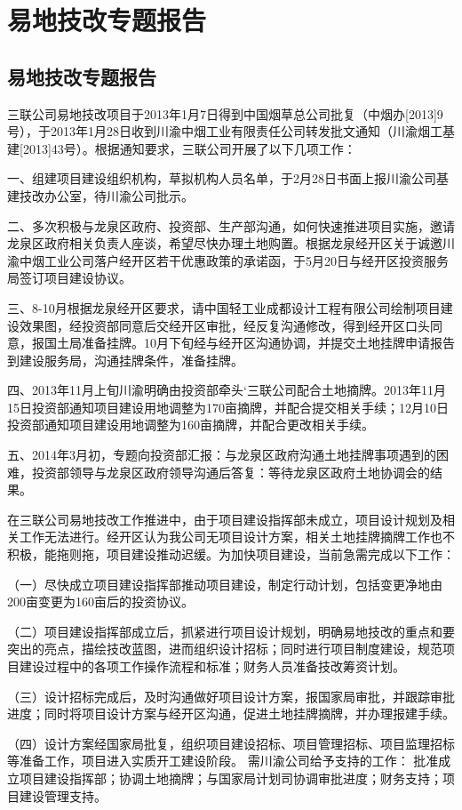 ﻿\chapter{易地技改专题报告}
\section{易地技改专题报告}
三联公司易地技改项目于2013年1月7日得到中国烟草总公司批复（中烟办[2013]9号），于2013年1月28日收到川渝中烟工业有限责任公司转发批文通知（川渝烟工基建[2013]43号）。根据通知要求，三联公司开展了以下几项工作：

一、组建项目建设组织机构，草拟机构人员名单，于2月28日书面上报川渝公司基建技改办公室，待川渝公司批示。

二、多次积极与龙泉区政府、投资部、生产部沟通，如何快速推进项目实施，邀请龙泉区政府相关负责人座谈，希望尽快办理土地购置。根据龙泉经开区关于诚邀川渝中烟工业公司落户经开区若干优惠政策的承诺函，于5月20日与经开区投资服务局签订项目建设协议。

三、8-10月根据龙泉经开区要求，请中国轻工业成都设计工程有限公司绘制项目建设效果图，经投资部同意后交经开区审批，经反复沟通修改，得到经开区口头同意，报国土局准备挂牌。10月下旬经与经开区沟通协调，并提交土地挂牌申请报告到建设服务局，沟通挂牌条件，准备挂牌。

四、2013年11月上旬川渝明确由投资部牵头‘三联公司配合土地摘牌。2013年11月15日投资部通知项目建设用地调整为170亩摘牌，并配合提交相关手续；12月10日投资部通知项目建设用地调整为160亩摘牌，并配合更改相关手续。

五、2014年3月初，专题向投资部汇报：与龙泉区政府沟通土地挂牌事项遇到的困难，投资部领导与龙泉区政府领导沟通后答复：等待龙泉区政府土地协调会的结果。

在三联公司易地技改工作推进中，由于项目建设指挥部未成立，项目设计规划及相关工作无法进行。经开区认为我公司无项目设计方案，相关土地挂牌摘牌工作也不积极，能拖则拖，项目建设推动迟缓。为加快项目建设，当前急需完成以下工作：

（一）尽快成立项目建设指挥部推动项目建设，制定行动计划，包括变更净地由200亩变更为160亩后的投资协议。

（二）项目建设指挥部成立后，抓紧进行项目设计规划，明确易地技改的重点和要突出的亮点，描绘技改蓝图，进而组织设计招标；同时进行项目制度建设，规范项目建设过程中的各项工作操作流程和标准；财务人员准备技改筹资计划。

（三）设计招标完成后，及时沟通做好项目设计方案，报国家局审批，并跟踪审批进度；同时将项目设计方案与经开区沟通，促进土地挂牌摘牌，并办理报建手续。

（四）设计方案经国家局批复，组织项目建设招标、项目管理招标、项目监理招标等准备工作，项目进入实质开工建设阶段。
需川渝公司给予支持的工作：
批准成立项目建设指挥部；协调土地摘牌；与国家局计划司协调审批进度；财务支持；项目建设管理支持。


